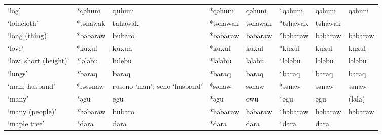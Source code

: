 \begin{landscape}
\begin{longtable}[c]{@{}p{3cm}<{\raggedright}p{2.75cm}<{\raggedright}p{2.75cm}<{\raggedright}p{2.75cm}<{\raggedright}p{2.75cm}<{\raggedright}p{2.75cm}<{\raggedright}p{2.75cm}<{\raggedright}p{2.75cm}<{\raggedright}@{}}
`log'                                                & *qəhuni            & quhuni                         & *qəhuni            & qəhuni                     & *qəhuni          & qəhuni                   & qəhuni                            \\
`loincloth'                                          & *təhawak           & tahawak                        & *təhawak           & təhawak                    & *təhawak         & təhawak                  &                                   \\
`long (thing)'                                       & *bəbaraw           & bubaro                         & *bəbaraw           & bəbaraw                    & *bəbaraw         & bəbaraw                  & bəbaraw                           \\
`love'                                               & *kuxul             & kuxun                          & *kuxul             & kuxul                      & *kuxul           & kuxul                    & kuxul                             \\
`low; short (height)'                                & *lələbu            & lulebu                         & *lələbu            & lələbu                     & *lələbu          & lələbu                   & lələbu                            \\
`lungs'                                              & *baraq             & baraq                          & *baraq             & baraq                      & *baraq           & baraq                    & baraq                             \\
`man; husband'                                       & *rəsənaw           & ruseno `man'; seno `husband'   & *sənaw             & sənaw                      & *sənaw           & sənaw                    & sənaw                             \\
`many'                                               & *əgu               & egu                            & *əgu               & owu                        & *əgu             & əgu                      & (lala)                            \\
`many (people)'                                      & *həbaraw           & hubaro                         & *həbaraw           & həbaraw                    & *həbaraw         & həbaraw                  & həbaraw                           \\
`maple tree'                                         & *dara              & dara                           & *dara              & dara                       & *dara            & dara                     &                                   \\

\end{longtable}
\end{landscape}
